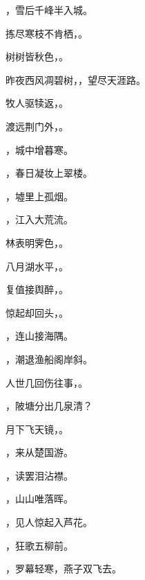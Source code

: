 \documentclass[12pt, a4paper, addpoints]{exam}
\begin{document}
\begin{questions}
\question[2] \uline{\qquad\qquad\qquad\qquad}，雪后千峰半入城。

\question[2] 拣尽寒枝不肯栖，\uline{\qquad\qquad\qquad\qquad}。

\question[2] 树树皆秋色，\uline{\qquad\qquad\qquad\qquad}。

\question[2] 昨夜西风凋碧树，\uline{\qquad\qquad\qquad\qquad}，望尽天涯路。

\question[2] 牧人驱犊返，\uline{\qquad\qquad\qquad\qquad}。

\question[2] 渡远荆门外，\uline{\qquad\qquad\qquad\qquad}。

\question[2] \uline{\qquad\qquad\qquad\qquad}，城中增暮寒。

\question[2] \uline{\qquad\qquad\qquad\qquad}，春日凝妆上翠楼。

\question[2] \uline{\qquad\qquad\qquad\qquad}，墟里上孤烟。

\question[2] \uline{\qquad\qquad\qquad\qquad}，江入大荒流。

\question[2] 林表明霁色，\uline{\qquad\qquad\qquad\qquad}。

\question[2] 八月湖水平，\uline{\qquad\qquad\qquad\qquad}。

\question[2] 复值接舆醉，\uline{\qquad\qquad\qquad\qquad}。

\question[2] 惊起却回头，\uline{\qquad\qquad\qquad\qquad}。

\question[2] \uline{\qquad\qquad\qquad\qquad}，连山接海隅。

\question[2] \uline{\qquad\qquad\qquad\qquad}，潮退渔船阁岸斜。

\question[2] 人世几回伤往事，\uline{\qquad\qquad\qquad\qquad}。

\question[2] \uline{\qquad\qquad\qquad\qquad}，陂塘分出几泉清？

\question[2] 月下飞天镜，\uline{\qquad\qquad\qquad\qquad}。

\question[2] \uline{\qquad\qquad\qquad\qquad}，来从楚国游。

\question[2] \uline{\qquad\qquad\qquad\qquad}，读罢泪沾襟。

\question[2] \uline{\qquad\qquad\qquad\qquad}，山山唯落晖。

\question[2] \uline{\qquad\qquad\qquad\qquad}，见人惊起入芦花。

\question[2] \uline{\qquad\qquad\qquad\qquad}，狂歌五柳前。

\question[2] \uline{\qquad\qquad\qquad\qquad}，罗幕轻寒，燕子双飞去。

\end{questions}
\end{document}
